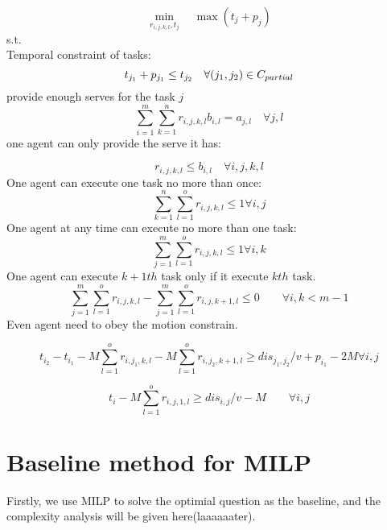 \documentclass[10pt, Oct]{IEEEtran}
\begin{document}
$$\min_{r_{i,j,k,l}, t_j} \quad \max(t_j+p_j)$$
s.t.\\
Temporal constraint of tasks:
\begin{equation}
	t_{j_1}+p_{j_1}\leq t_{j_2} \quad  \forall (j_1,j_2)\in C_{partial}\\
	  \label{1}
\end{equation}
provide enough serves for the task $j$ 
\begin{equation}
  \sum_{i=1}^{m}\sum_{k=1}^{n}r_{i,j,k,l}b_{i,l}= a_{j,l}   \quad \forall j,l 
  \label{2}
\end{equation}
one agent can only provide the serve it has:

\begin{equation}
r_{i,j,k,l}\leq b_{i,l}   \quad \forall i,j,k,l
\label{3}
\end{equation}
One agent can execute one task no more than once:
\begin{equation}
\sum_{k=1}^{n}\sum_{l=1}^{o}r_{i,j,k,l} \leq 1   \forall i,j
\label{4}
\end{equation}
One agent at any time can execute no more than one task:
\begin{equation}
	\sum_{j=1}^{m}\sum_{l=1}^{o}r_{i,j,k,l} \leq 1    \forall i,k
	\label{5}
\end{equation}
One agent can execute $k+1th$ task only if it execute $kth$ task.
\begin{equation}
\sum_{j=1}^{m}\sum_{l=1}^{o}r_{i,j,k,l} - \sum_{j=1}^{m}\sum_{l=1}^{o}r_{i,j,k+1,l}\leq  0    \qquad\forall i,k<m-1
\label{6}
\end{equation}
Even agent need to obey the motion constrain.

\begin{equation}
t_{i_2}-t_{i_1} -M\sum_{l=1}^o r_{i,j_1,k,l}-M\sum_{l=1}^o r_{i,j_2,k+1,l}  \geq dis_{j_1,j_2}/v+p_{i_1}-2M   \forall i,j
\label{7}
\end{equation}

\begin{equation}
t_{i} -M\sum_{l=1}^o r_{i,j,1,l} \geq dis_{i,j}/v-M \qquad  \forall i,j
\label{8}
\end{equation}
\section{Baseline method for MILP}
Firstly, we use MILP to solve the optimial question as the baseline, and the complexity analysis will be given here(laaaaaater). 
\end{document}
